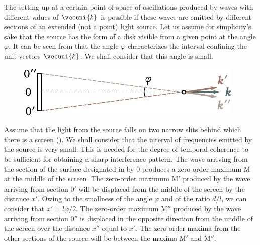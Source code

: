 The setting up at a certain point of space of oscillations produced by waves with different values of $\vecuni{k}$ is possible if these waves are emitted by different sections of an extended (not a point) light source.
Let us assume for simplicity's sake that the source has the form of a disk visible from a given point at the angle $\varphi$.
It can be seen from  that the angle $\varphi$ characterizes the interval confining the
unit vectors $\vecuni{k}$.
We shall consider that this angle is small.

\begin{figure}[!htb]
	\begin{center}
		\includegraphics[scale=1]{figures/ch_17/fig_17_6.pdf}
		\caption[]{}
		\label{fig:17_6}
	\end{center}
	\vspace{-0.9cm}
\end{figure}

Assume that the light from the source falls on two narrow slits behind which there is a screen ().
We shall consider that the interval of frequencies emitted by the source is very small.
This is needed for the degree of temporal coherence to be sufficient for obtaining a sharp interference pattern.
The wave arriving from the section of the surface designated in  by $0$ produces a zero-order maximum M at the middle of the screen.
The zero-order maximum M$'$ produced by the wave arriving from section $0'$ will be displaced from the middle of the screen by the distance $x'$.
Owing to the smallness of the angle $\varphi$ and of the ratio $d/l$, we can consider that $x' = l\varphi/2$.
The zero-order maximum M$''$ produced by the wave arriving from section $0''$ is displaced in the opposite direction from the middle of the screen over the distance $x''$ equal to $x'$.
The zero-order maxima from the other sections of the source will be between the maxima M$'$ and M$''$.

